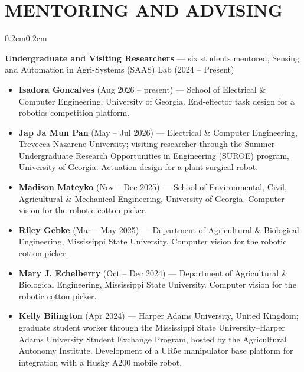 \documentclass[10pt, letterpaper]{article}
\newenvironment{highlights}{%
    \begin{itemize}[topsep=0.08cm, parsep=0.08cm, partopsep=0pt,
                    itemsep=0pt, leftmargin=0.4cm + 10pt]
}{\end{itemize}}
\newenvironment{onecolentry}{%
    \begin{adjustwidth}{0.2cm}{0.2cm}
}{\end{adjustwidth}}
\begin{document}
\section{MENTORING AND ADVISING}
\vspace{0.08cm}
\begin{onecolentry}
    \textbf{Undergraduate and Visiting Researchers} --- six students mentored, Sensing
    and Automation in Agri-Systems (SAAS) Lab (2024 -- Present)
    \begin{highlights}
        \item \textbf{Isadora Goncalves} (Aug 2026 -- present) --- School of Electrical
              \& Computer Engineering, University of Georgia. End-effector task design
              for a robotics competition platform.
        \item \textbf{Jap Ja Mun Pan} (May -- Jul 2026) --- Electrical \& Computer
              Engineering, Trevecca Nazarene University; visiting researcher through
              the Summer Undergraduate Research Opportunities in Engineering (SUROE)
              program, University of Georgia. Actuation design for a plant surgical
              robot.
        \item \textbf{Madison Mateyko} (Nov -- Dec 2025) --- School of Environmental,
              Civil, Agricultural \& Mechanical Engineering, University of Georgia.
              Computer vision for the robotic cotton picker.
        \item \textbf{Riley Gebke} (Mar -- May 2025) --- Department of Agricultural \&
              Biological Engineering, Mississippi State University. Computer vision
              for the robotic cotton picker.
        \item \textbf{Mary J. Echelberry} (Oct -- Dec 2024) --- Department of
              Agricultural \& Biological Engineering, Mississippi State University.
              Computer vision for the robotic cotton picker.
        \item \textbf{Kelly Bilington} (Apr 2024) --- Harper Adams University, United
              Kingdom; graduate student worker through the Mississippi State
              University--Harper Adams University Student Exchange Program, hosted by
              the Agricultural Autonomy Institute. Development of a UR5e manipulator
              base platform for integration with a Husky A200 mobile robot.
    \end{highlights}
    \vspace{0.12cm}


\end{onecolentry}
\end{document}
